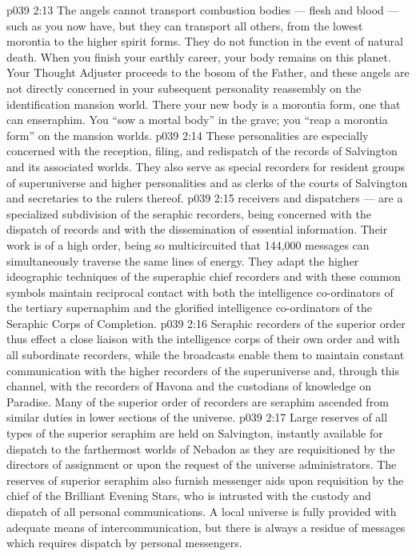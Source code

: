 \vs p039 2:13 \pc The angels cannot transport combustion bodies --- flesh and blood --- such as you now have, but they can transport all others, from the lowest morontia to the higher spirit forms. They do not function in the event of natural death. When you finish your earthly career, your body remains on this planet. Your Thought Adjuster proceeds to the bosom of the Father, and these angels are not directly concerned in your subsequent personality reassembly on the identification mansion world. There your new body is a morontia form, one that can enseraphim. You “sow a mortal body” in the grave; you “reap a morontia form” on the mansion worlds.
\vs p039 2:14 \pc {}\bibnobreakspace {} These personalities are especially concerned with the reception, filing, and redispatch of the records of Salvington and its associated worlds. They also serve as special recorders for resident groups of superuniverse and higher personalities and as clerks of the courts of Salvington and secretaries to the rulers thereof.
\vs p039 2:15 \pc {} receivers and dispatchers --- are a specialized subdivision of the seraphic recorders, being concerned with the dispatch of records and with the dissemination of essential information. Their work is of a high order, being so multicircuited that 144,000 messages can simultaneously traverse the same lines of energy. They adapt the higher ideographic techniques of the superaphic chief recorders and with these common symbols maintain reciprocal contact with both the intelligence co\hyp{}ordinators of the tertiary supernaphim and the glorified intelligence co\hyp{}ordinators of the Seraphic Corps of Completion.
\vs p039 2:16 Seraphic recorders of the superior order thus effect a close liaison with the intelligence corps of their own order and with all subordinate recorders, while the broadcasts enable them to maintain constant communication with the higher recorders of the superuniverse and, through this channel, with the recorders of Havona and the custodians of knowledge on Paradise. Many of the superior order of recorders are seraphim ascended from similar duties in lower sections of the universe.
\vs p039 2:17 \pc {}\bibnobreakspace {} Large reserves of all types of the superior seraphim are held on Salvington, instantly available for dispatch to the farthermost worlds of Nebadon as they are requisitioned by the directors of assignment or upon the request of the universe administrators. The reserves of superior seraphim also furnish messenger aids upon requisition by the chief of the Brilliant Evening Stars, who is intrusted with the custody and dispatch of all personal communications. A local universe is fully provided with adequate means of intercommunication, but there is always a residue of messages which requires dispatch by personal messengers.
